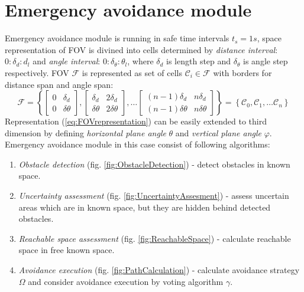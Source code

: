 \section{Emergency avoidance module}\label{s:emergencyAvoidanceModule2D}
Emergency avoidance module is running in safe time intervals $t_s =1s$, space representation of FOV is divined into cells determined by \textit{distance interval}: $0:\delta_d:d_l$ and \textit{angle interval}: $0:\delta_\theta:\theta_l$, where $\delta_d$ is length step and $\delta_\theta$ is angle step respectively. FOV $\mathscr{F}$ is represented as set of cells $\mathscr{C}_i \in \mathscr{F}$ with borders for distance span and angle span:
\begin{equation}\label{eq:FOVrepresentation}
    \mathscr{F}=\left\{
    \begin{bmatrix}
    0 & \delta_d\\
    0 & \delta\theta
    \end{bmatrix},
    \begin{bmatrix}
    \delta_d & 2\delta_d\\
    \delta\theta & 2\delta\theta
    \end{bmatrix},\dots
    \begin{bmatrix}
    (n-1)\delta_d & n\delta_d\\
    (n-1)\delta\theta & n\delta\theta
    \end{bmatrix}
    \right\}
    = \left\{\mathscr{C}_0,\mathscr{C}_1,\dots\mathscr{C}_n\right\}
\end{equation}
Representation (\ref{eq:FOVrepresentation}) can be easily extended to third dimension by defining \textit{horizontal plane angle} $\theta$ and \textit{vertical plane angle} $\varphi$.
Emergency avoidance module in this case consist of following algorithms:
\begin{enumerate}
    \item \textit{Obstacle detection} (fig. \ref{fig:ObstacleDetection}) - detect obstacles in known space.
    \item \textit{Uncertainty assessment} (fig. \ref{fig:UncertaintyAssesment}) - assess uncertain areas which are in known space, but they are hidden behind detected obstacles.
    \item \textit{Reachable space assessment} (fig. \ref{fig:ReachableSpace}) - calculate reachable space in free known space.
    \item \textit{Avoidance execution} (fig. \ref{fig:PathCalculation}) - calculate avoidance strategy $\Omega$ and consider avoidance execution by voting algorithm $\gamma$.
\end{enumerate}
